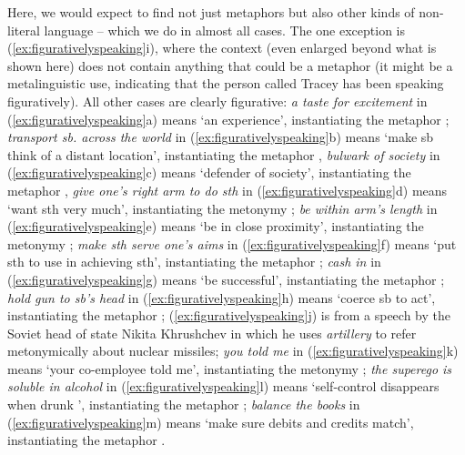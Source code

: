 Here, we would expect to find not just metaphors  but also other kinds of non\hyp{}literal language -- which we do in almost all cases. The one exception is (\ref{ex:figurativelyspeaking}i), where the context (even enlarged beyond what is shown here) does not contain anything that could be a metaphor  (it might be a metalinguistic use, indicating that the person called Tracey has been speaking figuratively). All other cases are clearly figurative:  \textit{a taste for excitement} in (\ref{ex:figurativelyspeaking}a) means `an experience', instantiating the metaphor ; \textit{transport sb. across the world} in (\ref{ex:figurativelyspeaking}b) means `make sb think of a distant location', instantiating the metaphor  , \textit{bulwark of society} in (\ref{ex:figurativelyspeaking}c) means `defender of society', instantiating the metaphor , \textit{give one's right arm to do sth} in (\ref{ex:figurativelyspeaking}d) means `want sth very much', instantiating the metonymy ; \textit{be within arm's length} in (\ref{ex:figurativelyspeaking}e) means `be in close proximity', instantiating the metonymy ; \textit{make sth serve one's aims} in (\ref{ex:figurativelyspeaking}f) means `put sth to use in achieving sth', instantiating the metaphor  ; \textit{cash in} in (\ref{ex:figurativelyspeaking}g) means `be successful', instantiating the metaphor ; \textit{hold gun to sb's head} in (\ref{ex:figurativelyspeaking}h) means `coerce sb to act', instantiating the metaphor  ; (\ref{ex:figurativelyspeaking}j) is from a speech by the Soviet head of state Nikita Khrushchev in which he uses \textit{artillery} to refer metonymically about nuclear missiles; \textit{you told me} in (\ref{ex:figurativelyspeaking}k) means `your co\hyp{}employee told me', instantiating the metonymy ; \textit{the superego is soluble in alcohol} in (\ref{ex:figurativelyspeaking}l) means `self\hyp{}control disappears when drunk ', instantiating the metaphor  ; \textit{balance the books} in (\ref{ex:figurativelyspeaking}m) means `make sure debits and credits match', instantiating the metaphor .

